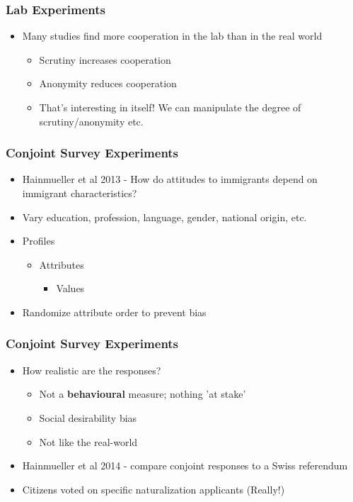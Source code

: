 \documentclass[xcolor=x11names,compress]{beamer}\usepackage[]{graphicx}\usepackage[]{xcolor}
\renewcommand{\(}{\begin{columns}}
\renewcommand{\)}{\end{columns}}
\newcommand{\<}[1]{\begin{column}{#1}}
\renewcommand{\>}{\end{column}}
\begin{document}
\begin{frame}
\frametitle{Lab Experiments}
\begin{itemize}
\item Many studies find more cooperation in the lab than in the real world
\pause
\begin{itemize}
\item Scrutiny increases cooperation
\pause
\item Anonymity reduces cooperation
\pause
\item That's interesting in itself! We can manipulate the degree of scrutiny/anonymity etc.
\end{itemize}
\end{itemize}
\end{frame}

\begin{frame}
\frametitle{Conjoint Survey Experiments}
\begin{itemize}
\item Hainmueller et al 2013 - How do attitudes to immigrants depend on immigrant characteristics?
\pause
\item Vary education, profession, language, gender, national origin, etc.
\pause
\item Profiles
\begin{itemize}
\item Attributes
\begin{itemize}
\item Values
\pause
\end{itemize}
\end{itemize}
\item Randomize attribute order to prevent bias
\end{itemize}
\end{frame}





\begin{frame}
\frametitle{Conjoint Survey Experiments}
\begin{itemize}
\item How realistic are the responses?
\pause
\begin{itemize}
\item Not a \textbf{behavioural} measure; nothing 'at stake'
\pause
\item Social desirability bias
\pause
\item Not like the real-world
\pause
\end{itemize}
\item Hainmueller et al 2014 - compare conjoint responses to a Swiss referendum
\pause
\item Citizens voted on specific naturalization applicants (Really!)
\end{itemize}
\end{frame}
\end{document}
